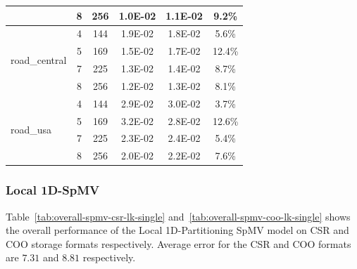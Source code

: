 \documentclass[conference, 10ppt]{IEEEtran}
\begin{document}
\begin{table}[htb]
\begin{tabular}[c]{| l | c | c | c | c | c |}
  &  8  &  256  &  1.0E-02  &  1.1E-02  &  9.2\% \\ \hline
\multirow{4}{*}{road\_central}  &  4  &  144  &  1.9E-02  &  1.8E-02  &  5.6\% \\ \cline{2-6}
  &  5  &  169  &  1.5E-02  &  1.7E-02  &  12.4\% \\ \cline{2-6}
  &  7  &  225  &  1.3E-02  &  1.4E-02  &  8.7\% \\ \cline{2-6}
\  &  8  &  256  &  1.2E-02  &  1.3E-02  &  8.1\% \\ \hline
\multirow{4}{*}{road\_usa}  &  4  &  144  &  2.9E-02  &  3.0E-02  &  3.7\% \\ \cline{2-6}
  &  5  &  169  &  3.2E-02  &  2.8E-02  &  12.6\% \\ \cline{2-6}
  &  7  &  225  &  2.3E-02  &  2.4E-02  &  5.4\% \\ \cline{2-6}
  &  8  &  256  &  2.0E-02  &  2.2E-02  &  7.6\% \\ \hline
\end{tabular}
\end{table}

\subsubsection{Local 1D-SpMV}
Table~\ref{tab:overall-spmv-csr-lk-single} and~\ref{tab:overall-spmv-coo-lk-single} shows the overall performance of the Local 1D-Partitioning 
SpMV model on CSR and COO storage formats respectively.  Average error for the CSR and COO formats are 
$7.31$ and $8.81$ respectively. 
\end{document}
